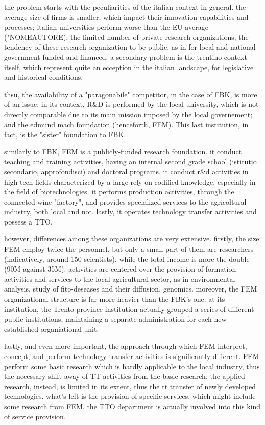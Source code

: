 the problem starts with the peculiarities of the italian context in general. the average size of firms is smaller, which impact their innovation capabilities and processes; italian universities perform worse than the EU average ("NOMEAUTORE); the limited number of private research organizations; the tendency of these research organization to be public, as in for local and national government funded and financed. a secondary problem is the trentino context itself, which represent quite an ecception in the italian landscape, for legislative and historical conditions. 

thsu, the availability of a "paragonabile" competitor, in the case of FBK, is more of an issue. in its context, R\&D is performed by the local university, which is not directly comparable due to its main mission imposed by the local governement; and the edmund mach foundation (henceforth, FEM). This last institution, in fact, is the "sister" foundation to FBK. 

similarly to FBK, FEM is a publicly-funded research foundation. it conduct teaching and training activities, having an internal second grade school (istitutio secondario, approfondisci) and doctoral programs. it conduct r\&d activities in high-tech fields characterized by a large rely on codified knowledge, especially in the field of biotechnologies. it performs production activities, through the connected wine "factory", and provides specialized services to the agricoltural industry, both local and not. lastly, it operates technology transfer activities and possess a TTO.

however, differences among these organizations are very extensive. firstly, the size: FEM employ twice the personnel, but only a small part of them are researchers (indicatively, around 150 scientists), while the total income is more the double (90M against 35M). activities are centered over the provision of formation activities and services to the local agricultural sector, as in environmental analysis, study of fito-deseases and their diffusion, genomics. moreover, the FEM organizational structure is far more heavier than the FBK's one: at its institution, the Trento province institution actually grouped a series of different public institutions, maintaining a separate administration for each new established organiational unit. 

lastly, and even more important, the approach through which FEM interpret, concept, and perform technology transfer activities is significantly different. FEM perform some basic research which is hardly applicable to the local industry, thus the necessary shift away of TT activities from the basic research. the applied research, instead, is limited in its extent, thus the tt transfer of newly developed technologies. what's left is the provision of specific services, which might include some research from FEM. the TTO department is actually involved into this kind of service provision.

